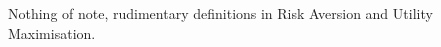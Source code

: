 \documentclass[11pt]{article}
\begin{document}
\maketitle
\thispagestyle{first}
Nothing of note, rudimentary definitions in Risk Aversion and Utility Maximisation. 
\end{document}
